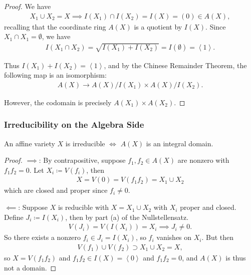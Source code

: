 \begin{proof}

We have
\begin{align*}
X_1 \cup X_2 = X \implies I(X_1) \cap I(X_2) = I(X) = (0) \in A(X)
,\end{align*}
recalling that the coordinate ring \(A(X)\) is a quotient by \(I(X)\).
Since \(X_1 \cap X_1 = \emptyset\), we have
\begin{align*}  
I(X_1 \cap X_2) = \sqrt{I(X_1) + I(X_2) } = I(\emptyset) = \left\langle{1}\right\rangle
.\end{align*}

Thus \(I(X_1) + I(X_2) = \left\langle{1}\right\rangle\), and by the
Chinese Remainder Theorem, the following map is an isomorphism:
\begin{align*}  
A(X) \to A(X)/I(X_1) \times A(X) / I(X_2)
.\end{align*}

However, the codomain is precisely \(A(X_1) \times A(X_2)\).

\end{proof}

\hypertarget{irreducibility-on-the-algebra-side}{%
\subsubsection{Irreducibility on the Algebra
Side}\label{irreducibility-on-the-algebra-side}}

\begin{proposition}[?]

An affine variety \(X\) is irreducible \(\iff\) \(A(X)\) is an integral
domain.

\end{proposition}

\begin{proof}

\(\implies\): By contrapositive, suppose \(f_1, f_2 \in A(X)\) are
nonzero with \(f_1 f_2 = 0\). Let \(X_i \coloneqq V(f_i)\), then
\begin{align*}
X= V(0) = V(f_1 f_2) = X_1 \cup X_2
\end{align*}
which are closed and proper since \(f_i \neq 0\).

\hfill\break

\(\impliedby\): Suppose \(X\) is reducible with \(X = X_1 \cup X_2\)
with \(X_i\) proper and closed. Define \(J_i \coloneqq I(X_i)\), then by
part (a) of the Nullstellensatz.
\begin{align*}  
V(J_i) = V(I(X_i)) = X_i \implies J_i \neq 0
.\end{align*}
So there exists a nonzero \(f_i \in J_i = I(X_i)\), so \(f_i\) vanishes
on \(X_i\). But then
\begin{align*}
V(f_1) \cup V(f_2) \supset X_1 \cup X_2 = X
,\end{align*}
so \(X= V(f_1 f_2)\) and
\(f_1 f_2 \in I(X) = \left\langle{0}\right\rangle\) and \(f_1 f_2 = 0\),
and \(A(X)\) is thus not a domain.

\end{proof}

